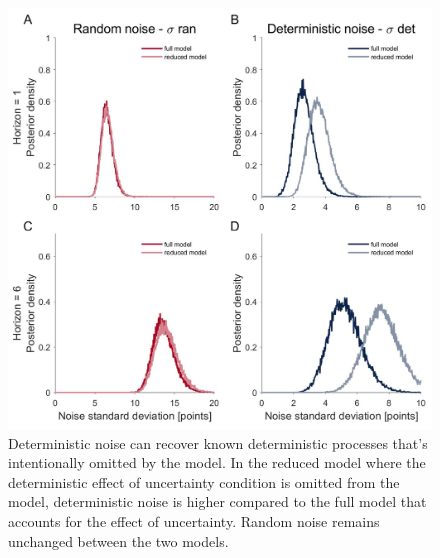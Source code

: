 \documentclass[12pt]{article}
\begin{document}
	\begin{figure}[H]
		\begin{center}
			\includegraphics[width=\textwidth]{figures/RDBayes_reduced_model.jpg}
			\caption{Deterministic noise can recover known deterministic processes that's intentionally omitted by the model. In the reduced model where the deterministic effect of uncertainty condition is omitted from the model, deterministic noise is higher compared to the full model that accounts for the effect of uncertainty. Random noise remains unchanged between the two models.}
			\label{fig:reducedmodel}
		\end{center}
	\end{figure} 
	\newpage
\end{document}
